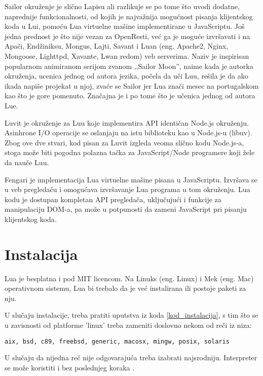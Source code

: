 \documentclass[a4paper]{article}
\begin{document}
Sailor okruženje je slično Lapisu ali razlikuje se po tome što uvodi dodatne, naprednije funkcionalnosti, od kojih je najvažnija mogućnost pisanja klijentskog koda u Lui, pomoću Lua virtuelne mašine implementirane u JavaScriptu. Još jedna prednost je što nije vezan za OpenResti, već ga je moguće izvršavati i na Apači, Endžiniksu, Mongus, Lajti, Savant i Luan (eng. Apache2, Nginx, Mongoose, Lighttpd, Xavante, Lwan redom) veb serverima. Naziv je inspirisan popularnom animiranom serijom zvanom ,,Sailor Moon'', naime kada je autorka okruženja, ucenica jednog od autora jezika, počela da uči Luu, rešila je da ako ikada napiše projekat u njoj, zvaće se Sailor jer Lua znači mesec na portugalskom kao što je gore pomenuto. Značajna je i po tome što je učenica jednog od autora Lue\cite{frameworkSailor}. 

Luvit je okruženje za Luu koje implementira API identičan Node.js okruženju. Asinhrone I/O operacije se oslanjaju na istu biblioteku kao u Node.js-u (libuv). Zbog ove dve stvari, kod pisan za Luvit izgleda veoma slično kodu Node.js-a, stoga može biti pogodna polazna tačka za JavaScript/Node programere koji žele da nauče Luu. 

Fengari je implementacija Lua virtuelne mašine pisana u JavaScriptu. Izvršava se u veb pregledaču i omogućava izvršavanje Lua programa u tom okruženju. Lua kodu je dostupan kompletan API pregledača, uključujući i funkcije za manipulaciju DOM-a, pa može u potpunosti da zameni JavaScript pri pisanju klijentskog koda\cite{frameworkFengari}.


\section{Instalacija}
\label{sec:instalacija}
  Lua je besplatna i pod MIT licencom. %
Na Linuks (eng. Linux) i Mek (eng. Mac) operativnom sistemu, Lua bi trebalo da je već instalirana ili postoje paketi za nju. 

U slučaju instalacije, treba pratiti uputstva iz koda \ref{kod_instalacija}, s tim što se u zavisnosti od platforme 'linux' treba zameniti doslovno nekom od reči iz niza:
\begin{verbatim}
aix, bsd, c89, freebsd, generic, macosx, mingw, posix, solaris
\end{verbatim}
 U slučaju da nijedna reč nije odgovarajuća treba izabrati najsrodniju. Interpreter se može koristiti i bez poslednjeg koraka \cite{lua_org}.
\end{document}

